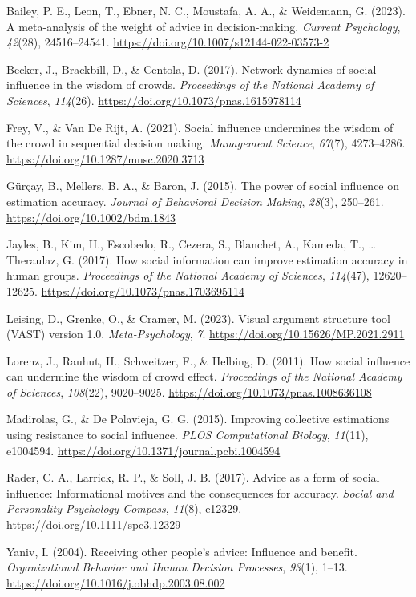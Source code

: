 \documentclass[
  man,mask,floatsintext]{apa6}
\newlength{\cslhangindent}
\newenvironment{CSLReferences}[2] %
 {\begin{list}{}{%
  \setlength{\itemindent}{0pt}
  \setlength{\leftmargin}{0pt}
  \setlength{\parsep}{0pt}
  \ifodd #1
   \setlength{\leftmargin}{\cslhangindent}
   \setlength{\itemindent}{-1\cslhangindent}
  \fi
  \setlength{\itemsep}{#2\baselineskip}}}
 {\end{list}}
\begin{document}
\label{refs}
\begin{CSLReferences}{1}{0}
Bailey, P. E., Leon, T., Ebner, N. C., Moustafa, A. A., \& Weidemann, G. (2023). A meta-analysis of the weight of advice in decision-making. \emph{Current Psychology}, \emph{42}(28), 24516--24541. \url{https://doi.org/10.1007/s12144-022-03573-2}

Becker, J., Brackbill, D., \& Centola, D. (2017). Network dynamics of social influence in the wisdom of crowds. \emph{Proceedings of the National Academy of Sciences}, \emph{114}(26). \url{https://doi.org/10.1073/pnas.1615978114}

Frey, V., \& Van De Rijt, A. (2021). Social influence undermines the wisdom of the crowd in sequential decision making. \emph{Management Science}, \emph{67}(7), 4273--4286. \url{https://doi.org/10.1287/mnsc.2020.3713}

Gürçay, B., Mellers, B. A., \& Baron, J. (2015). The power of social influence on estimation accuracy. \emph{Journal of Behavioral Decision Making}, \emph{28}(3), 250--261. \url{https://doi.org/10.1002/bdm.1843}

Jayles, B., Kim, H., Escobedo, R., Cezera, S., Blanchet, A., Kameda, T., \ldots{} Theraulaz, G. (2017). How social information can improve estimation accuracy in human groups. \emph{Proceedings of the National Academy of Sciences}, \emph{114}(47), 12620--12625. \url{https://doi.org/10.1073/pnas.1703695114}

Leising, D., Grenke, O., \& Cramer, M. (2023). Visual argument structure tool ({VAST}) version 1.0. \emph{Meta-Psychology}, \emph{7}. \url{https://doi.org/10.15626/MP.2021.2911}

Lorenz, J., Rauhut, H., Schweitzer, F., \& Helbing, D. (2011). How social influence can undermine the wisdom of crowd effect. \emph{Proceedings of the National Academy of Sciences}, \emph{108}(22), 9020--9025. \url{https://doi.org/10.1073/pnas.1008636108}

Madirolas, G., \& De Polavieja, G. G. (2015). Improving collective estimations using resistance to social influence. \emph{{PLOS} Computational Biology}, \emph{11}(11), e1004594. \url{https://doi.org/10.1371/journal.pcbi.1004594}

Rader, C. A., Larrick, R. P., \& Soll, J. B. (2017). Advice as a form of social influence: Informational motives and the consequences for accuracy. \emph{Social and Personality Psychology Compass}, \emph{11}(8), e12329. \url{https://doi.org/10.1111/spc3.12329}

Yaniv, I. (2004). Receiving other people's advice: Influence and benefit. \emph{Organizational Behavior and Human Decision Processes}, \emph{93}(1), 1--13. \url{https://doi.org/10.1016/j.obhdp.2003.08.002}

\end{CSLReferences}
\end{document}
